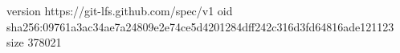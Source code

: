 version https://git-lfs.github.com/spec/v1
oid sha256:09761a3ac34ae7a24809e2e74ce5d4201284dff242c316d3fd64816ade121123
size 378021
